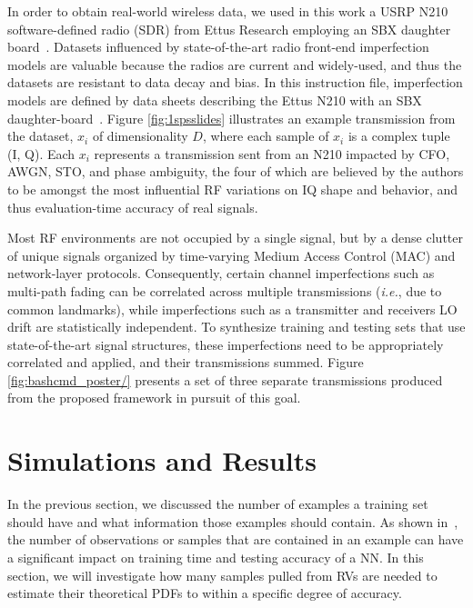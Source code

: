 In order to obtain real-world wireless data, we used in this work a USRP N210 software-defined radio (SDR) from Ettus Research employing an SBX daughter board~\cite{6815911}. Datasets influenced by state-of-the-art radio front-end imperfection models are valuable because the radios are current and widely-used, and thus the datasets are resistant to data decay and bias. In this instruction file, imperfection models are defined by data sheets describing the Ettus N210 with an SBX daughter-board~\cite{n210sbx}. Figure \ref{fig:1spsslides} illustrates an example transmission from the dataset, $x_i$ of dimensionality $D$, where each sample of $x_i$ is a complex tuple (I, Q). Each $x_i$ represents a transmission sent from an N210 impacted by CFO, AWGN, STO, and phase ambiguity, the four of which are believed by the authors to be amongst the most influential RF variations on IQ shape and behavior, and thus evaluation-time accuracy of real signals.

Most RF environments are not occupied by a single signal, but by a dense clutter of unique signals organized by time-varying Medium Access Control (MAC) and network-layer protocols. Consequently, certain channel imperfections such as multi-path fading can be correlated across multiple transmissions (\textit{i.e.}, due to common landmarks), while imperfections such as a transmitter and receivers LO drift are statistically independent. To synthesize training and testing sets that use state-of-the-art signal structures, these imperfections need to be appropriately correlated and applied, and their transmissions summed. Figure \ref{fig:bashcmd_poster/} presents a set of three separate transmissions produced from the proposed framework in pursuit of this goal.


\section{Simulations and Results}
\label{sec4}

In the previous section, we discussed the number of examples a training set should have and what information those examples should contain. As shown in~\cite{8170853}, the number of observations or samples that are contained in an example can have a significant impact on training time and testing accuracy of a NN. In this section, we will investigate how many samples pulled from RVs are needed to estimate their theoretical PDFs to within a specific degree of accuracy.

